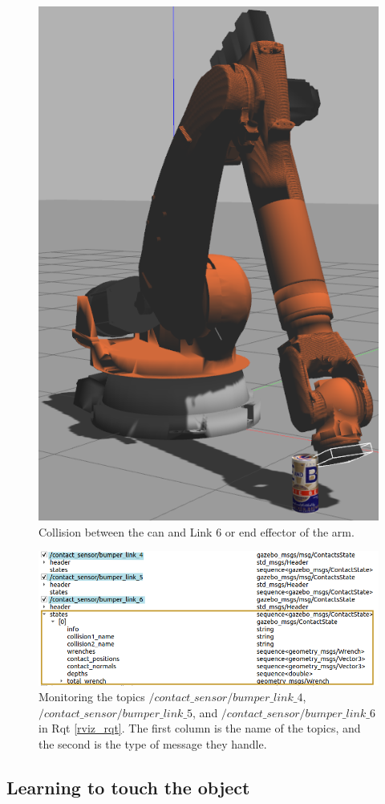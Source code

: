 \documentclass[12pt,oneside]{article}
\begin{document}
\begin{figure}[H]
\centering
\includegraphics[width=0.4\linewidth]{link_6_collision}
\caption{Collision between the can and Link 6 or end effector of the arm.}
\label{fig:link6collision}
\end{figure}
\begin{figure}[H]
\centering
\includegraphics[width=0.9\linewidth]{rqt_link_6_collision}
\caption{Monitoring the topics $/contact\_sensor/bumper\_link\_4$, $/contact\_sensor/bumper\_link\_5$, and $/contact\_sensor/bumper\_link\_6$ in Rqt \ref{rviz_rqt}. The first column is the name of the topics, and the second is the type of message they handle. }
\label{fig:rqtlink6collision}
\end{figure}

\subsection{Learning to touch the object}
\end{document}
